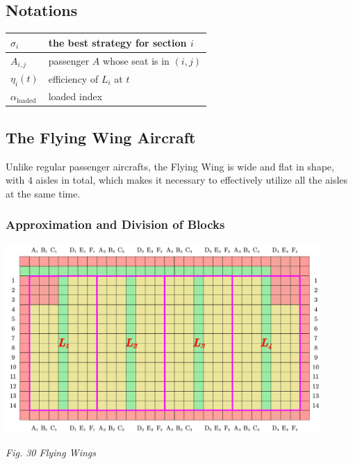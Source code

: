 \documentclass{article}
\theoremstyle{definition}
\theoremstyle{remark}
\numberwithin{equation}{section}
\begin{document}
	\subsection{Notations}
	\begin{center}
	\begin{tabular}{|l|l|}
		\hline
		$\sigma_i$&the best strategy for section $i$\\
		\hline
		$A_{i,j}$&passenger $A$ whose seat is in $\left(i,j\right)$\\
		\hline
		$\eta_i(t)$&efficiency of $L_i$ at $t$\\
		\hline
		$\alpha_\text{loaded}$&loaded index\\
		\hline
	\end{tabular}
	\end{center}
	\subsection{The Flying Wing Aircraft}
	Unlike regular passenger aircrafts, the Flying Wing is wide and flat in shape, with \(4\) aisles in total, which makes it necessary to effectively utilize all the aisles at the same time.

	\subsubsection{Approximation and Division of Blocks}

	\begin{center}
		\includegraphics[width=12cm]{flyingwings.jpg}

		\small \textit{Fig. 30 Flying Wings}
	\end{center}
\end{document}
